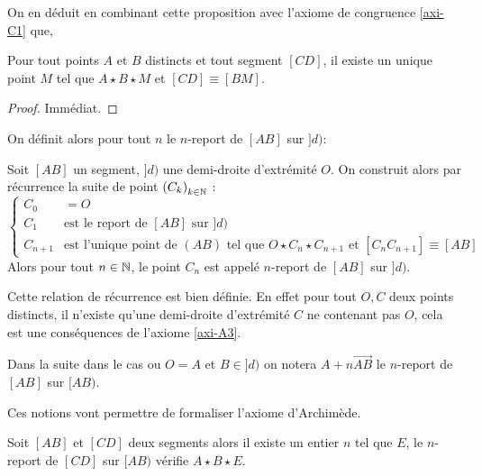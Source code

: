 On en déduit en combinant cette proposition avec l'axiome de congruence \ref{axi-C1} que,
\begin{prop}
    Pour tout points $A$ et $B$ distincts et tout segment $[CD]$, il existe un unique point $M$ tel que $A\star B \star M$ et $[CD]\equiv [BM]$. 
\begin{proof}
    Immédiat.
\end{proof}
\end{prop}

On définit alors pour tout $n$ le $n$-report de $[AB]$ sur $]d)$:
\begin{defi}[$n$-Report]
    Soit $[AB]$ un segment, $]d)$ une demi-droite d'extrémité $O$. On construit alors par récurrence la suite de point $\left(C_{k}\right)_{k \in \mathbb{N}}$ :
    \begin{equation*}
        \left\{\begin{array}{rl}
             C_0 & = O\\
             C_1 & \text{est le report de $[AB]$ sur $]d)$} \\%
             C_{n+1} & \text{est l'unique point de $(AB)$ tel que $O\star C_n \star C_{n+1}$ et $[C_n C_{n+1}]\equiv [AB]$}
        \end{array}
        \right.
    \end{equation*}
    Alors pour tout $n\in \mathbb{N}$, le point $C_n$ est appelé $n$-report de $[AB]$ sur $]d)$.
\end{defi}

\begin{rema}
\end{rema}

\begin{rema}
    Cette relation de récurrence est bien définie. En effet pour tout $O,C$ deux points distincts, il n'existe qu'une demi-droite d'extrémité $C$ ne contenant pas $O$, cela est une conséquences de l'axiome \ref{axi-A3}. 
\end{rema}
\begin{rema}
    Dans la suite dans le cas ou $O=A$ et $B\in ]d)$ on notera $A+n\overrightarrow{AB}$ le $n$-report de $[AB]$ sur $[AB)$.
\end{rema}
Ces notions vont permettre de formaliser l'axiome d'Archimède. 
\begin{axi}[Archimède]\label{axi-archimede}
    Soit $[AB]$ et $[CD]$ deux segments alors il existe un entier $n$ tel que $E$, le $n$-report de $[CD]$ sur $[AB)$ vérifie $A\star B \star E$. 
\end{axi}

